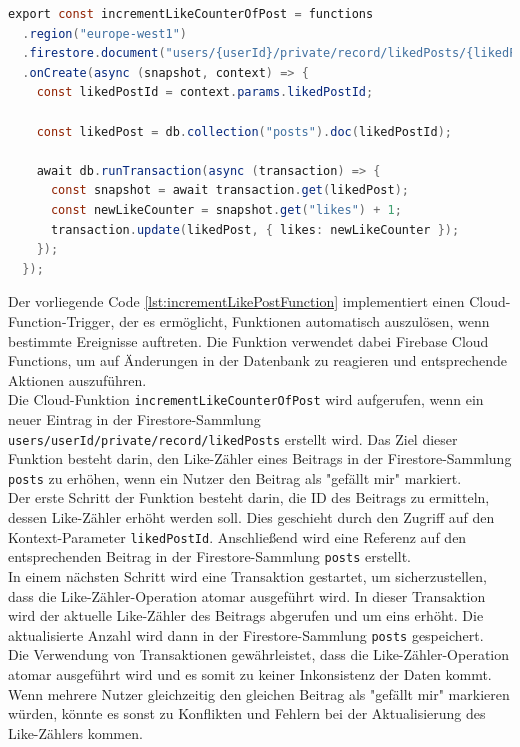 \begin{lstlisting}[language=Java,caption=incrementLikeCounterOfPost Funktion,label=lst:incrementLikePostFunction]
  export const incrementLikeCounterOfPost = functions
  .region("europe-west1")
  .firestore.document("users/{userId}/private/record/likedPosts/{likedPostId}")
  .onCreate(async (snapshot, context) => {
    const likedPostId = context.params.likedPostId;

    const likedPost = db.collection("posts").doc(likedPostId);

    await db.runTransaction(async (transaction) => {
      const snapshot = await transaction.get(likedPost);
      const newLikeCounter = snapshot.get("likes") + 1;
      transaction.update(likedPost, { likes: newLikeCounter });
    });
  });
\end{lstlisting}

Der vorliegende Code \ref{lst:incrementLikePostFunction} implementiert einen Cloud-Function-Trigger, der es ermöglicht, Funktionen automatisch auszulösen, wenn bestimmte Ereignisse auftreten. Die Funktion verwendet dabei Firebase Cloud Functions, um auf Änderungen in der Datenbank zu reagieren und entsprechende Aktionen auszuführen.
\\
Die Cloud-Funktion \texttt{incrementLikeCounterOfPost} wird aufgerufen, wenn ein neuer Eintrag in der Firestore-Sammlung \texttt{users/{userId}/private/record/likedPosts} erstellt wird. Das Ziel dieser Funktion besteht darin, den Like-Zähler eines Beitrags in der Firestore-Sammlung \texttt{posts} zu erhöhen, wenn ein Nutzer den Beitrag als "gefällt mir" markiert.
\\
Der erste Schritt der Funktion besteht darin, die ID des Beitrags zu ermitteln, dessen Like-Zähler erhöht werden soll. Dies geschieht durch den Zugriff auf den Kontext-Parameter \texttt{likedPostId}. Anschließend wird eine Referenz auf den entsprechenden Beitrag in der Firestore-Sammlung \texttt{posts} erstellt.
\\
In einem nächsten Schritt wird eine Transaktion gestartet, um sicherzustellen, dass die Like-Zähler-Operation atomar ausgeführt wird. In dieser Transaktion wird der aktuelle Like-Zähler des Beitrags abgerufen und um eins erhöht. Die aktualisierte Anzahl wird dann in der Firestore-Sammlung \texttt{posts} gespeichert.
\\
Die Verwendung von Transaktionen gewährleistet, dass die Like-Zähler-Operation atomar ausgeführt wird und es somit zu keiner Inkonsistenz der Daten kommt. Wenn mehrere Nutzer gleichzeitig den gleichen Beitrag als "gefällt mir" markieren würden, könnte es sonst zu Konflikten und Fehlern bei der Aktualisierung des Like-Zählers kommen.

